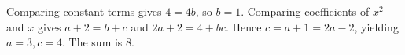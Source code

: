 Comparing constant terms gives $4=4b$, so $b=1$. Comparing coefficients of $x^2$ and $x$ gives $a+2=b+c$ and $2a+2=4+bc$. Hence $c=a+1=2a-2$, yielding $a=3,c=4$. The sum is $\boxed8$.
